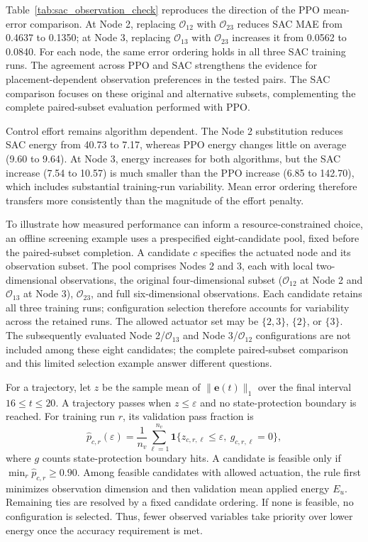 \documentclass[a4paper,fleqn]{cas-dc}
\theoremstyle{plain}
\theoremstyle{definition}
\begin{document}
Table~\ref{tab:sac_observation_check} reproduces the direction of the PPO mean-error comparison. At Node 2, replacing $\mathcal O_{12}$ with $\mathcal O_{23}$ reduces SAC MAE from 0.4637 to 0.1350; at Node 3, replacing $\mathcal O_{13}$ with $\mathcal O_{23}$ increases it from 0.0562 to 0.0840. For each node, the same error ordering holds in all three SAC training runs. The agreement across PPO and SAC strengthens the evidence for placement-dependent observation preferences in the tested pairs. The SAC comparison focuses on these original and alternative subsets, complementing the complete paired-subset evaluation performed with PPO.

Control effort remains algorithm dependent. The Node 2 substitution reduces SAC energy from 40.73 to 7.17, whereas PPO energy changes little on average (9.60 to 9.64). At Node 3, energy increases for both algorithms, but the SAC increase (7.54 to 10.57) is much smaller than the PPO increase (6.85 to 142.70), which includes substantial training-run variability. Mean error ordering therefore transfers more consistently than the magnitude of the effort penalty. 

To illustrate how measured performance can inform a resource-constrained choice, an offline screening example uses a prespecified eight-candidate pool, fixed before the paired-subset completion. A candidate $c$ specifies the actuated node and its observation subset. The pool comprises Nodes 2 and 3, each with local two-dimensional observations, the original four-dimensional subset ($\mathcal O_{12}$ at Node 2 and $\mathcal O_{13}$ at Node 3), $\mathcal O_{23}$, and full six-dimensional observations. Each candidate retains all three training runs; configuration selection therefore accounts for variability across the retained runs. The allowed actuator set may be $\{2,3\}$, $\{2\}$, or $\{3\}$. The subsequently evaluated Node 2/$\mathcal O_{13}$ and Node 3/$\mathcal O_{12}$ configurations are not included among these eight candidates; the complete paired-subset comparison and this limited selection example answer different questions.

For a trajectory, let $z$ be the sample mean of $\|\mathbf e(t)\|_1$ over the final interval $16\leq t\leq20$. A trajectory passes when $z\leq\varepsilon$ and no state-protection boundary is reached. For training run $r$, its validation pass fraction is
\begin{equation}
 \widehat p_{c,r}(\varepsilon)
 =\frac{1}{n_v}\sum_{\ell=1}^{n_v}
 \mathbf 1\{z_{c,r,\ell}\leq\varepsilon,\ g_{c,r,\ell}=0\},
 \label{eq:configuration_pass}
\end{equation}
where $g$ counts state-protection boundary hits. A candidate is feasible only if $\min_r\widehat p_{c,r}\geq0.90$. Among feasible candidates with allowed actuation, the rule first minimizes observation dimension and then validation mean applied energy $E_u$. Remaining ties are resolved by a fixed candidate ordering. If none is feasible, no configuration is selected. Thus, fewer observed variables take priority over lower energy once the accuracy requirement is met.
\end{document}
